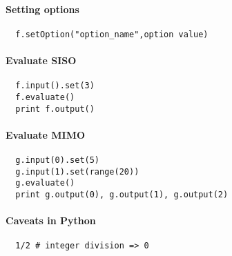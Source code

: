\documentclass[a4paper,8pt,twocolumn]{article}
\begin{document}
\paragraph{Setting options}
\begin{verbatim}
  f.setOption("option_name",option value)
\end{verbatim}

\paragraph{Evaluate SISO}

\begin{verbatim}
  f.input().set(3)
  f.evaluate()
  print f.output()
\end{verbatim}

\paragraph{Evaluate MIMO}
\begin{verbatim}
  g.input(0).set(5)
  g.input(1).set(range(20))
  g.evaluate()
  print g.output(0), g.output(1), g.output(2)
\end{verbatim}

\paragraph{Caveats in Python}
\begin{verbatim}
  1/2 # integer division => 0
\end{verbatim}
\end{document}
